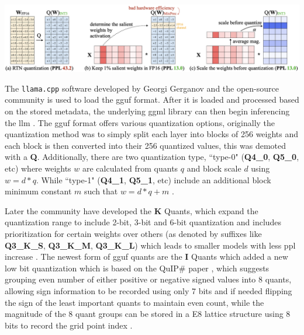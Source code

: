 \documentclass{ifacconf}
\begin{document}
	\begin{strip}
		\centering
		\includegraphics[width=\linewidth, height=0.2\textheight]{awq}
		\label{fig:awq}
	\end{strip}
	
	The \texttt{llama.cpp} software developed by Georgi Gerganov and the open-source community is used to load the \gls{gguf} format. After it is loaded and processed based on the stored metadata, the underlying \gls{ggml} library can then begin inferencing the \gls{llm} \cite{ggufgithub}. The \gls{gguf} format offers various quantization options, originally the quantization method was to simply split each layer into blocks of 256 weights and each block is then converted into their 256 quantized values, this was demoted with a \textbf{Q}. Additionally, there are two quantization type, ``type-0" (\textbf{Q4\_0}, \textbf{Q5\_0}, etc) where weights $w$ are calculated from quants $q$ and block scale $d$ using $w = d * q$. While ``type-1" (\textbf{Q4\_1}, \textbf{Q5\_1}, etc) include an additional block minimum constant $m$ such that $w = d * q + m$ \cite{ggufgithubquantdoc, ggufgithubkquantpr}. 
	
	Later the community have developed the \textbf{K} Quants, which expand the quantization range to include 2-bit, 3-bit and 6-bit quantization and includes prioritization for certain weights over others (as denoted by suffixes like \textbf{Q3\_K\_S}, \textbf{Q3\_K\_M}, \textbf{Q3\_K\_L}) which leads to smaller models with less \gls{ppl} increase \cite{ggufgithubkquantpr}. The newest form of \gls{gguf} quants are the \textbf{I} Quants which added a new low bit quantization \cite{ggufgithubiquantpr} which is based on the QuIP\# paper \cite{tseng2024quipbetterllmquantization}, which suggests grouping even number of either positive or negative signed values into 8 quants, allowing sign information to be recorded using only 7 bits and if needed flipping the sign of the least important quants to maintain even count, while the magnitude of the 8 quant groups can be stored in a E8 lattice structure using 8 bits to record the grid point index \cite{ggufgithubiquantpr}. 
	
\end{document}
